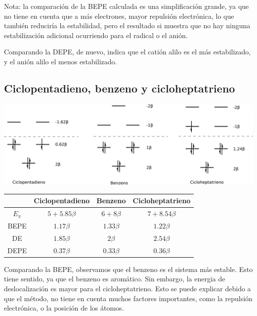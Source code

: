 \documentclass[12pt]{article}
\begin{document}
Nota: la comparación de la BEPE calculada es una simplificación grande, ya que no tiene en cuenta que a más electrones, mayor repulsión electrónica, lo que también reduciría la estabilidad, pero el resultado si muestra que no hay ninguna estabilización adicional ocurriendo para el radical o el anión. \cite{yates}

Comparando la DEPE, de nuevo, indica que el catión alilo es el más estabilizado, y el anión alilo el menos estabilizado.






\subsection{Ciclopentadieno, benzeno y cicloheptatrieno}
\begin{center}
    \includegraphics[height=0.25\textwidth]{cycles_diagram.png}
\end{center}

\begin{center}
\begin{tabular}{|c|c|c|c|}
\hline
 &  Ciclopentadieno           & Benzeno         & Cicloheptatrieno \\
\hline
    $E_{\pi}$ & $5+5.85 \beta$  & $6+8  \beta$ & $7+8.54 \beta$ \\
    BEPE      & $1.17   \beta$  & $1.33 \beta$ & $1.22   \beta$ \\ 
    DE        & $1.85   \beta$  & $2    \beta$ & $2.54   \beta$ \\
    DEPE      & $0.37   \beta$  & $0.33 \beta$ & $0.36   \beta$ \\ 
\hline
\end{tabular}
\end{center}

Comparando la BEPE, observamos que el benzeno es el sistema más estable. Esto tiene sentido, ya que el benzeno es aromático. Sin embargo, la energia de deslocalización es mayor para el cicloheptatrieno. Esto se puede explicar debido a que el método, no tiene en cuenta muchos factores importantes, como la repulsión electrónica, o la posición de los átomos.
\end{document}
